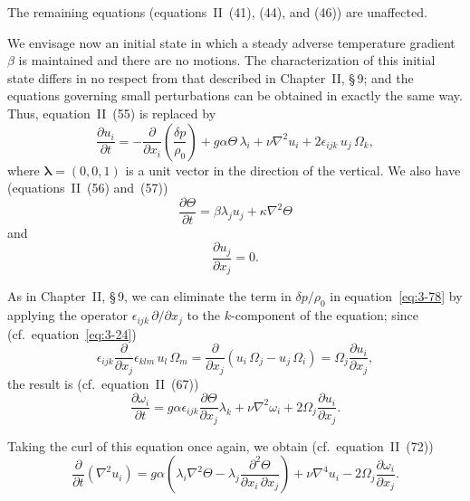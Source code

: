 The remaining equations (equations~II~(41), (44), and (46)) are unaffected.

We envisage now an initial state in which a steady adverse temperature gradient $\beta$ is maintained and there are no motions. The characterization of this initial state differs in no respect from that described in Chapter~II, \S\,9; and the equations governing small perturbations can be obtained in exactly the same way. Thus, equation~II~(55) is replaced by
\begin{equation}\label{eq:3-78}
\frac{\partial u_i}{\partial t} = -\frac{\partial}{\partial x_i}\!\left(\frac{\delta p}{\rho_0}\right) + g\alpha\Theta\,\lambda_i + \nu\nabla^2 u_i + 2\epsilon_{ijk}\, u_j\,\Omega_k,
\end{equation}
where $\boldsymbol{\lambda} = (0,0,1)$ is a unit vector in the direction of the vertical. We also have (equations~II~(56) and~(57))
\begin{equation}\label{eq:3-79}
\frac{\partial\Theta}{\partial t} = \beta\lambda_j u_j + \kappa\nabla^2\Theta
\end{equation}
and
\begin{equation}\label{eq:3-80}
\frac{\partial u_j}{\partial x_j} = 0.
\end{equation}

As in Chapter~II, \S\,9, we can eliminate the term in $\delta p/\rho_0$ in equation~\eqref{eq:3-78} by applying the operator $\epsilon_{ijk}\,\partial/\partial x_j$ to the $k$-component of the equation; since (cf.\ equation~\eqref{eq:3-24})
\begin{equation}\label{eq:3-81}
\epsilon_{ijk}\frac{\partial}{\partial x_j}\epsilon_{klm}\, u_l\,\Omega_m = \frac{\partial}{\partial x_j}(u_i\,\Omega_j - u_j\,\Omega_i) = \Omega_j\frac{\partial u_i}{\partial x_j},
\end{equation}
the result is (cf.\ equation~II~(67))
\begin{equation}\label{eq:3-82}
\frac{\partial\omega_i}{\partial t} = g\alpha\epsilon_{ijk}\frac{\partial\Theta}{\partial x_j}\lambda_k + \nu\nabla^2\omega_i + 2\Omega_j\frac{\partial u_i}{\partial x_j}.
\end{equation}

Taking the curl of this equation once again, we obtain (cf.\ equation~II~(72))
\begin{equation}\label{eq:3-83}
\frac{\partial}{\partial t}(\nabla^2 u_i) = g\alpha\!\left(\lambda_i\nabla^2\Theta - \lambda_j\frac{\partial^2\Theta}{\partial x_i\,\partial x_j}\right) + \nu\nabla^4 u_i - 2\Omega_j\frac{\partial\omega_i}{\partial x_j}.
\end{equation}

